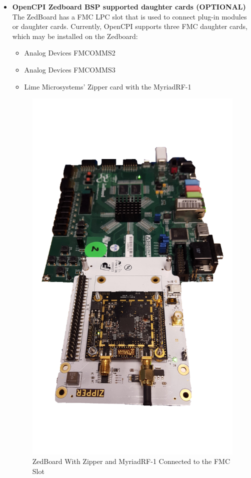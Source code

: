 \begin{flushleft}
\begin{itemize}
\item \textbf{OpenCPI Zedboard BSP supported daughter cards (OPTIONAL)}\\
The ZedBoard has a FMC LPC slot that is used to connect plug-in modules or daughter cards. Currently, OpenCPI supports three FMC daughter cards, which may be installed on the Zedboard:
\begin{itemize}
	\item Analog Devices FMCOMMS2
	\item Analog Devices FMCOMMS3
	\item Lime Microsystems' Zipper card with the MyriadRF-1
\end{itemize} \medskip

\begin{figure}[ht]
	\centerline{\includegraphics[scale=0.05]{zed_zipper}}
	\caption{ZedBoard With Zipper and MyriadRF-1 Connected to the FMC Slot}
	\label{fig:zed_zipper}
\end{figure}


\end{itemize}
\end{flushleft}
